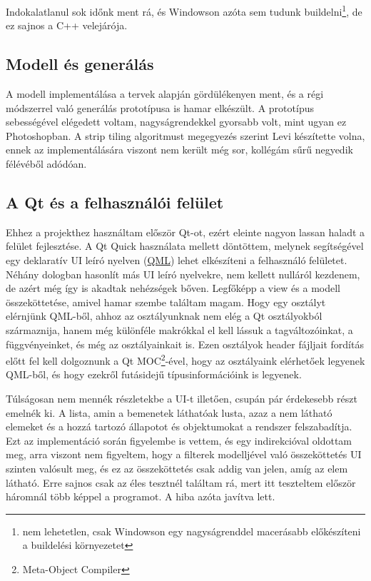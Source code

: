Indokalatlanul sok időnk ment rá, és Windowson azóta sem tudunk buildelni\footnote{nem lehetetlen, csak Windowson egy nagyságrenddel macerásabb előkészíteni a buildelési környezetet}, de ez sajnos a C++ velejárója.

\subsection{Modell és generálás}

A modell implementálása a tervek alapján gördülékenyen ment, és a régi módszerrel való generálás prototípusa is hamar elkészült. A prototípus sebességével elégedett voltam, nagyságrendekkel gyorsabb volt, mint ugyan ez Photoshopban. A strip tiling algoritmust megegyezés szerint Levi készítette volna, ennek az implementálására viszont nem került még sor, kollégám sűrű negyedik félévéből adódóan.

\subsection{A Qt és a felhasználói felület}

Ehhez a projekthez használtam először Qt-ot, ezért eleinte nagyon lassan haladt a felület fejlesztése. A Qt Quick használata mellett döntöttem, melynek segítségével egy deklaratív UI leíró nyelven (\href{https://en.wikipedia.org/wiki/QML}{QML}) lehet elkészíteni a felhasználó felületet. Néhány dologban hasonlít más UI leíró nyelvekre, nem kellett nulláról kezdenem, de azért még így is akadtak nehézségek bőven. Legfőképp a view és a modell összeköttetése, amivel hamar szembe találtam magam. Hogy egy osztályt elérnjünk QML-ből, ahhoz az osztályunknak nem elég a Qt osztályokból származnija, hanem még különféle makrókkal el kell lássuk a tagváltozóinkat, a függvényeinket, és még az osztályainkait is. Ezen osztályok header fájljait fordítás előtt fel kell dolgoznunk a Qt MOC\footnote{Meta-Object Compiler}-ével, hogy az osztályaink elérhetőek legyenek QML-ből, és hogy ezekről futásidejű típusinformációink is legyenek. 

Túlságosan nem mennék részletekbe a UI-t illetően, csupán pár érdekesebb részt emelnék ki. A lista, amin a bemenetek láthatóak lusta, azaz a nem látható elemeket és a hozzá tartozó állapotot és objektumokat a rendszer felszabadítja. Ezt az implementáció során figyelembe is vettem, és egy indirekcióval oldottam meg, arra viszont nem figyeltem, hogy a filterek modelljével való összeköttetés UI szinten valósult meg, és ez az összeköttetés csak addig van jelen, amíg az elem látható. Erre sajnos csak az éles tesztnél találtam rá, mert itt teszteltem először háromnál több képpel a programot. A hiba azóta javítva lett.

